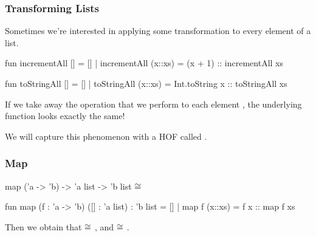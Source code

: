 \documentclass[aspectratio=169, handout]{beamer}
\begin{document}
\begin{frame}[fragile]
  \frametitle{Transforming Lists}

  Sometimes we're interested in applying some transformation to every element of a list.

  \pause
  \vspace{\fill}

  \begin{codeblock}
    fun incrementAll [] = []
      | incrementAll (x::xs) = (x + 1) :: incrementAll xs

    fun toStringAll [] = []
      | toStringAll (x::xs) = Int.toString x :: toStringAll xs
  \end{codeblock}

  \vspace{\fill}
  \pause

  If we take away the operation that we perform to each element , the underlying
  function looks exactly the same!

  \pause
  \vspace{\fill}

  We will capture this phenomenon with a HOF called .
\end{frame}

\begin{frame}[fragile]
  \frametitle{Map}

  \spec
    {map}
    {('a -> 'b) -> 'a list -> 'b list}
    {}
    { $\cong$ \code{[f x1, ..., f xn]}}

  \pause
  \vspace{\fill}

  \begin{codeblock}
    fun map (f : 'a -> 'b) ([] : 'a list) : 'b list = []
      | map f (x::xs) = f x :: map f xs
  \end{codeblock}

  \pause
  \vspace{\fill}

  Then we obtain that  $\cong$ ,
  and  $\cong$ .
\end{frame}
\end{document}
